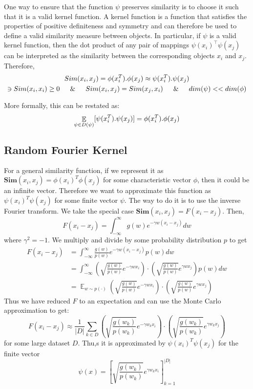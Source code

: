\documentclass[12pt]{article}
\newcommand{\Simi}{\boldsymbol{Sim}}
\begin{document}
One way to ensure that the function $\psi$ preserves similarity is to choose it such that it is a valid kernel function. A kernel function is a function that satisfies the properties of positive definiteness and symmetry and can therefore be used to define a valid similarity measure between objects. In particular, if $\psi$ is a valid kernel function, then the dot product of any pair of mappings $\psi(x_i)^{\top} \psi(x_j)$ can be interpreted as the similarity between the corresponding objects $x_i$ and $x_j$. Therefore, 
\begin{gather}
Sim(x_i, x_j) = \phi(x_i^T).\phi(x_j) \approx \psi(x_i^T).\psi(x_j) \notag \\
\ni Sim(x_i, x_i) \geq 0 \indent \& \indent Sim (x_i,x_j) = Sim (x_j, x_i) \indent \& \indent dim(\psi) << dim(\phi) \notag
\end{gather}

More formally, this can be restated as:
\begin{equation}
    \mathop{\mathbb{E}}_{\psi \in D(\psi)}[\psi(x_i^T).\psi(x_j)] = \phi(x_i^T).\phi(x_j) \notag
\end{equation}




\subsection{Random Fourier Kernel}

For a general similarity function, if we represent it as $\Simi(x_i,x_j)=\phi(x_i)^T \phi(x_j)$ for some characteristic vector $\phi$, then it could be an infinite vector. Therefore we want to approximate this function as $\psi(x_i)^T \psi(x_j)$ for some finite vector $\psi$. The way to do it is to use the inverse Fourier transform. We take the special case $\Simi(x_i,x_j)=F(x_i-x_j)$. Then,
$$F(x_i-x_j)=\int_{-\infty}^{\infty} g(w) e^{-\gamma w(x_i-x_j)} dw $$
where $\gamma^2=-1$. We multiply and divide by some probability distribution $p$ to get
\begin{align*}
    F(x_i-x_j) &= \int_{-\infty}^{\infty} \frac{g(w)}{p(w)} e^{-\gamma w(x_i-x_j)} p(w)dw \\
    &= \int_{-\infty}^{\infty} \left (\sqrt{\frac{g(w)}{p(w)}} e^{-\gamma wx_i} \right) \cdot \left (\sqrt{\frac{g(w)}{p(w)}} e^{\gamma wx_j} \right) p(w)dw \\
    &= \mathop{\mathbb{E}}_{w \sim p(\cdot)}  \left (\sqrt{\frac{g(w)}{p(w)}} e^{-\gamma wx_i} \right) \cdot \left (\sqrt{\frac{g(w)}{p(w)}} e^{\gamma wx_j} \right)
\end{align*}
Thus we have reduced $F$ to an expectation and can use the Monte Carlo approximation to get:
$$F(x_i-x_j) \approx \frac{1}{|D|} \sum_{k \in D}  \left (\sqrt{\frac{g(w_k)}{p(w_k)}} e^{-\gamma w_kx_i} \right) \cdot \left (\sqrt{\frac{g(w_k)}{p(w_k)}} e^{\gamma w_kx_j} \right)$$
for some large dataset $D$. Thu,s it is approximated by $\psi(x_i)^T \psi(x_j)$ for the finite vector $$\psi(x)=\left [ \sqrt{\frac{g(w_k)}{p(w_k)}} e^{\gamma w_kx_i} \right ]_{k=1}^{|D|}$$ 
\end{document}
